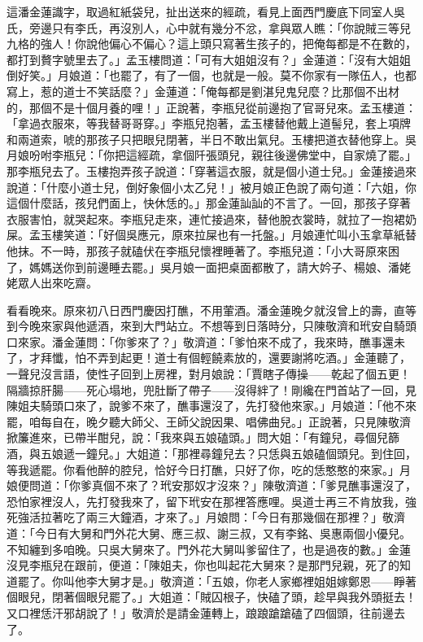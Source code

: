 這潘金蓮識字，取過紅紙袋兒，扯出送來的經疏，看見上面西門慶底下同室人吳氏，旁邊只有李氏，再沒別人，心中就有幾分不忿，拿與眾人瞧：「你說賊三等兒九格的強人！你說他偏心不偏心？這上頭只寫著生孩子的，把俺每都是不在數的，都打到贅字號里去了。」孟玉樓問道：「可有大姐姐沒有？」金蓮道：「沒有大姐姐倒好笑。」月娘道：「也罷了，有了一個，也就是一般。莫不你家有一隊伍人，也都寫上，惹的道士不笑話麼？」金蓮道：「俺每都是劉湛兒鬼兒麼？比那個不出材的，那個不是十個月養的哩！」正說著，李瓶兒從前邊抱了官哥兒來。孟玉樓道：「拿過衣服來，等我替哥哥穿。」李瓶兒抱著，孟玉樓替他戴上道髻兒，套上項牌和兩道索，唬的那孩子只把眼兒閉著，半日不敢出氣兒。玉樓把道衣替他穿上。吳月娘吩咐李瓶兒：「你把這經疏，拿個阡張頭兒，親往後邊佛堂中，自家燒了罷。」那李瓶兒去了。玉樓抱弄孩子說道：「穿著這衣服，就是個小道士兒。」金蓮接過來說道：「什麼小道士兒，倒好象個小太乙兒！」被月娘正色說了兩句道：「六姐，你這個什麼話，孩兒們面上，快休恁的。」那金蓮訕訕的不言了。一回，那孩子穿著衣服害怕，就哭起來。李瓶兒走來，連忙接過來，替他脫衣裳時，就拉了一抱裙奶屎。孟玉樓笑道：「好個吳應元，原來拉屎也有一托盤。」月娘連忙叫小玉拿草紙替他抹。不一時，那孩子就磕伏在李瓶兒懷裡睡著了。李瓶兒道：「小大哥原來困了，媽媽送你到前邊睡去罷。」吳月娘一面把桌面都散了，請大妗子、楊娘、潘姥姥眾人出來吃齋。

看看晚來。原來初八日西門慶因打醮，不用葷酒。潘金蓮晚夕就沒曾上的壽，直等到今晚來家與他遞酒，來到大門站立。不想等到日落時分，只陳敬濟和玳安自騎頭口來家。潘金蓮問：「你爹來了？」敬濟道：「爹怕來不成了，我來時，醮事還未了，才拜懺，怕不弄到起更！道士有個輕饒素放的，還要謝將吃酒。」金蓮聽了，一聲兒沒言語，使性子回到上房裡，對月娘說：「賈瞎子傳操——乾起了個五更！隔牆掠肝腸——死心塌地，兜肚斷了帶子——沒得絆了！剛纔在門首站了一回，見陳姐夫騎頭口來了，說爹不來了，醮事還沒了，先打發他來家。」月娘道：「他不來罷，咱每自在，晚夕聽大師父、王師父說因果、唱佛曲兒。」正說著，只見陳敬濟掀簾進來，已帶半酣兒，說：「我來與五娘磕頭。」問大姐：「有鐘兒，尋個兒篩酒，與五娘遞一鐘兒。」大姐道：「那裡尋鐘兒去？只恁與五娘磕個頭兒。到住回，等我遞罷。你看他醉的腔兒，恰好今日打醮，只好了你，吃的恁憨憨的來家。」月娘便問道：「你爹真個不來了？玳安那奴才沒來？」陳敬濟道：「爹見醮事還沒了，恐怕家裡沒人，先打發我來了，留下玳安在那裡答應哩。吳道士再三不肯放我，強死強活拉著吃了兩三大鐘酒，才來了。」月娘問：「今日有那幾個在那裡？」敬濟道：「今日有大舅和門外花大舅、應三叔、謝三叔，又有李銘、吳惠兩個小優兒。不知纏到多咱晚。只吳大舅來了。門外花大舅叫爹留住了，也是過夜的數。」金蓮沒見李瓶兒在跟前，便道：「陳姐夫，你也叫起花大舅來？是那門兒親，死了的知道罷了。你叫他李大舅才是。」敬濟道：「五娘，你老人家鄉裡姐姐嫁鄭恩——睜著個眼兒，閉著個眼兒罷了。」大姐道：「賊囚根子，快磕了頭，趁早與我外頭挺去！又口裡恁汗邪胡說了！」敬濟於是請金蓮轉上，踉踉蹌蹌磕了四個頭，往前邊去了。

